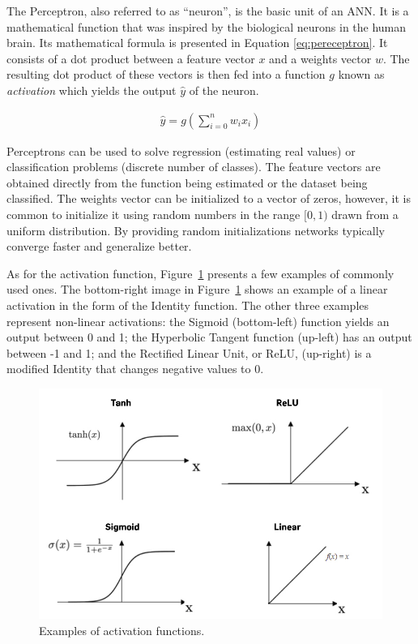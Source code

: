 The Perceptron, also referred to as ``neuron'', is the basic unit of an ANN. It
is a mathematical function that was inspired by the biological neurons in the
human brain. Its mathematical formula is presented in Equation
\ref{eq:pereceptron}. It consists of a dot product between a feature vector $x$
and a weights vector $w$. The resulting dot product of these vectors is then fed
into a function $g$ known as \textit{activation} which yields the output
$\hat{y}$ of the neuron.

\begin{align}
    \hat{y} = g\left(\sum^n_{i=0} w_ix_i\right)
    \label{eq:pereceptron}
\end{align}

Perceptrons can be used to solve regression (estimating real values) or
classification problems (discrete number of classes). The feature vectors are
obtained directly from the function being estimated or the dataset being
classified. The weights vector can be initialized to a vector of zeros, however,
it is common to initialize it using random numbers in the range $[0,1)$ drawn
from a uniform distribution. By providing random initializations networks
typically converge faster and generalize better.

As for the activation function, Figure~\ref{fig:activations} presents a few
examples of commonly used ones. The bottom-right image in
Figure~\ref{fig:activations} shows an example of a linear activation in the form
of the Identity function. The other three examples represent non-linear
activations: the Sigmoid (bottom-left) function yields an output between 0 and
1; the Hyperbolic Tangent function (up-left) has an output between -1 and 1; and
the Rectified Linear Unit, or ReLU, (up-right) is a modified Identity that
changes negative values to 0.

\begin{figure}[!htbp]
    \centering
    \includegraphics[width=.5\textwidth]{Images/activations.jpg}
    \caption{Examples of activation functions.}
    \label{fig:activations}
\end{figure}

